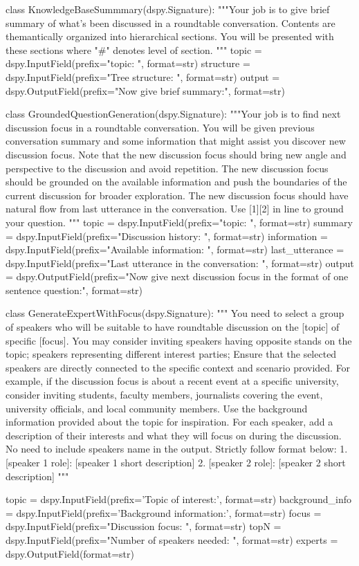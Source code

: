 \begin{prompt}
class KnowledgeBaseSummmary(dspy.Signature):
    """Your job is to give brief summary of what's been discussed in a roundtable conversation. Contents are themantically organized into hierarchical sections.
    You will be presented with these sections where "#" denotes level of section.
    """
    topic = dspy.InputField(prefix="topic: ", format=str)
    structure = dspy.InputField(prefix="Tree structure: \n", format=str)
    output = dspy.OutputField(prefix="Now give brief summary:\n", format=str)

class GroundedQuestionGeneration(dspy.Signature):
    """Your job is to find next discussion focus in a roundtable conversation. You will be given previous conversation summary and some information that might assist you discover new discussion focus.
       Note that the new discussion focus should bring new angle and perspective to the discussion and avoid repetition. The new discussion focus should be grounded on the available information and push the boundaries of the current discussion for broader exploration.
       The new discussion focus should have natural flow from last utterance in the conversation.
       Use [1][2] in line to ground your question. 
    """
    topic = dspy.InputField(prefix="topic: ", format=str)
    summary = dspy.InputField(prefix="Discussion history: \n", format=str)
    information = dspy.InputField(prefix="Available information: \n", format=str)
    last_utterance = dspy.InputField(prefix="Last utterance in the conversation: \n", format=str)
    output = dspy.OutputField(prefix="Now give next discussion focus in the format of one sentence question:\n", format=str)

class GenerateExpertWithFocus(dspy.Signature):
    """
    You need to select a group of speakers who will be suitable to have roundtable discussion on the [topic] of specific [focus].
    You may consider inviting speakers having opposite stands on the topic; speakers representing different interest parties; Ensure that the selected speakers are directly connected to the specific context and scenario provided.
    For example, if the discussion focus is about a recent event at a specific university, consider inviting students, faculty members, journalists covering the event, university officials, and local community members.
    Use the background information provided about the topic for inspiration. For each speaker, add a description of their interests and what they will focus on during the discussion.
    No need to include speakers name in the output.
    Strictly follow format below:
    1. [speaker 1 role]: [speaker 1 short description]
    2. [speaker 2 role]: [speaker 2 short description]
    """

    topic = dspy.InputField(prefix='Topic of interest:', format=str)
    background_info = dspy.InputField(prefix='Background information:\n', format=str)
    focus = dspy.InputField(prefix="Discussion focus: ", format=str)
    topN = dspy.InputField(prefix="Number of speakers needed: ", format=str)
    experts = dspy.OutputField(format=str)
    
\end{prompt}